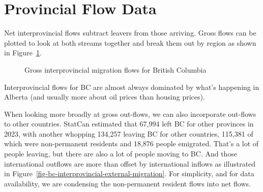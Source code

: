 \documentclass[
  letterpaper,
]{article}
\begin{document}
\section{Provincial Flow Data}\label{provincial-flow-data}

Net interprovincial flows subtract leavers from those arriving. Gross
flows can be plotted to look at both streams together and break them out
by region as shown in Figure~\ref{fig-bc-interprovincial-migration}.

\begin{figure}[H]


\caption{\label{fig-bc-interprovincial-migration}Gross interprovincial
migration flows for British Columbia}

\end{figure}%

Interprovincial flows for BC are almost always dominated by what's
happening in Alberta (and usually more about oil prices than housing
prices).

When looking more broadly at gross out-flows, we can also incorporate
out-flows to other countries. StatCan estimated that 67,994 left BC for
other provinces in 2023, with another whopping 134,257 leaving BC for
other countries, 115,381 of which were non-permanent residents and
18,876 people emigrated. That's a lot of people leaving, but there are
also a lot of people moving to BC. And those international outflows are
more than offset by international inflows as illustrated in
Figure~\ref{fig-bc-interprovincial-external-migration}. For simplicity,
and for data availability, we are condensing the non-permanent resident
flows into net flows.
\end{document}

